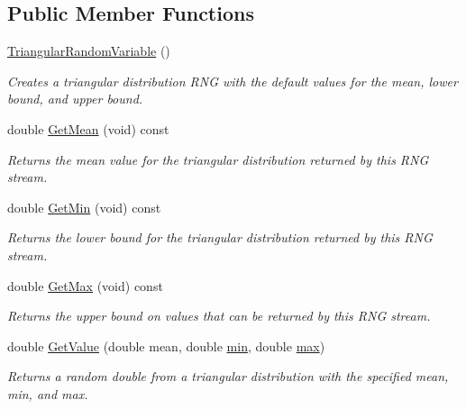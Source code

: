 \subsection*{Public Member Functions}
\begin{DoxyCompactItemize}
\item 
\hyperlink{classns3_1_1TriangularRandomVariable_abd0eecaac528becbde41e7b8d3ba764d}{Triangular\+Random\+Variable} ()
\begin{DoxyCompactList}\small\item\em Creates a triangular distribution R\+NG with the default values for the mean, lower bound, and upper bound. \end{DoxyCompactList}\item 
double \hyperlink{classns3_1_1TriangularRandomVariable_a78bf0f747b6501898491ca048172bf51}{Get\+Mean} (void) const 
\begin{DoxyCompactList}\small\item\em Returns the mean value for the triangular distribution returned by this R\+NG stream. \end{DoxyCompactList}\item 
double \hyperlink{classns3_1_1TriangularRandomVariable_ab174a0c0a487e2fb94cd6b5851814603}{Get\+Min} (void) const 
\begin{DoxyCompactList}\small\item\em Returns the lower bound for the triangular distribution returned by this R\+NG stream. \end{DoxyCompactList}\item 
double \hyperlink{classns3_1_1TriangularRandomVariable_a5729c1beb4574b37613f3c0fb4630ea3}{Get\+Max} (void) const 
\begin{DoxyCompactList}\small\item\em Returns the upper bound on values that can be returned by this R\+NG stream. \end{DoxyCompactList}\item 
double \hyperlink{classns3_1_1TriangularRandomVariable_aad1ce678507bb74ee2c5b09210c81c9b}{Get\+Value} (double mean, double \hyperlink{80211b_8c_ac6afabdc09a49a433ee19d8a9486056d}{min}, double \hyperlink{80211b_8c_affe776513b24d84b39af8ab0930fef7f}{max})
\begin{DoxyCompactList}\small\item\em Returns a random double from a triangular distribution with the specified mean, min, and max. \end{DoxyCompactList}\item 

\end{DoxyCompactItemize}
